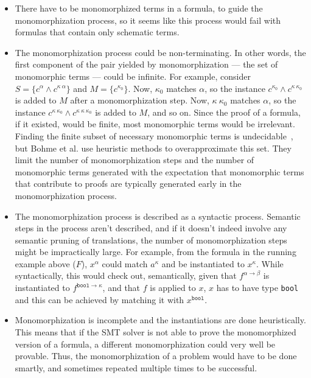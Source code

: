 \documentclass{article}
\begin{document}
		\begin{itemize}
		\item There have to be monomorphized 
			terms in a formula, to guide the 
			monomorphization process, so it 
			seems like this process would 
			fail with formulas that contain 
			only schematic terms. 
		\item The monomorphization process 
			could be non-terminating. In 
			other words, the first component
			of the pair yielded by 
			monomorphization --- the 
			set of monomorphic terms ---
			could be infinite. For example,
			consider $S = \{c^{\alpha}
			\land c^{\kappa\ \alpha}\}$
			and $M = \{c^{\kappa_0}\}$.
			Now, $\kappa_0$ matches 
			$\alpha$, so the instance
			$c^{\kappa_0} \land 
			c^{\kappa\ \kappa_0}$ is added 
			to $M$ after a monomorphization 
			step. Now, $\kappa\ \kappa_0$
			matches $\alpha$, so the 
			instance $c^{\kappa\ \kappa_0} 
			\land c^{\kappa\ \kappa\ 
			\kappa_0}$ is added to $M$, 
			and so on. Since the proof of a 
			formula, if it existed, would 
			be finite, most monomorphic 
			terms would be irrelevant. 
			Finding the finite subset of 
			necessary monomorphic terms is 
			undecidable~\cite{10.1007/978-3-642-24364-6_7},
			but Bohme et al. use heuristic
			methods to overapproximate
			this set. They limit the 
			number of monomorphization 
			steps and the number of 
			monomorphic terms generated
			with the expectation that 
			monomorphic terms that 
			contribute to proofs 
			are typically generated early 
			in the monomorphization process.
		\item The monomorphization process
			is described as a syntactic 
			process. Semantic steps in 
			the process aren't described, 
			and if it doesn't indeed 
			involve	any semantic pruning of 
			translations, the number of 
			monomorphization steps 
			might be impractically large. 
			For example, from the formula 
			in the running example above ($F$), 
			$x^{\alpha}$ could match 
			$a^{\kappa}$ and be instantiated 
			to $x^{\kappa}$. While 
			syntactically, this would 
			check out, semantically, 
			given that $f^{\alpha \to \beta}$
			is instantiated to 
			$f^{\texttt{bool} \to \kappa}$, 
			and that $f$ is applied to $x$, 
			$x$ has to have type 
			\texttt{bool} and this can be 
			achieved by matching it with 
			$x^{\texttt{bool}}$.
		\item Monomorphization is 
			incomplete and the instantiations 
			are done heuristically. This 
			means that if the SMT solver 
			is not able to prove the 
			monomorphized version of a 
			formula, a different 
			monomorphization could 
			very well be provable. Thus, 
			the monomorphization of a 
			problem would have to be 
			done smartly, and sometimes
			repeated multiple times to 
			be successful. 
		\end{itemize} 
	
\end{document}

